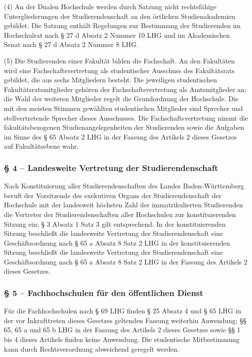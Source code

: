 \documentclass[
10pt,
a4paper,
twoside,								%
titlepage=false,							%
draft=false								%
]{scrartcl}
\begin{document}
(4) An der Dualen Hochschule werden durch Satzung nicht rechtsfähige Untergliederungen der Studierendenschaft an den örtlichen Studienakademien gebildet. Die Satzung enthält Regelungen zur Bestimmung der Studierenden im Hochschulrat nach § 27 d Absatz 2 Nummer 10 LHG und im Akademischen Senat nach § 27 d Absatz 2 Nummer 8 LHG.

(5) Die Studierenden einer Fakultät bilden die Fachschaft. An den Fakultäten wird eine Fachschaftsvertretung als studentischer Ausschuss des Fakultätsrats gebildet, die aus sechs Mitgliedern besteht. Die jeweiligen studentischen Fakultätsratsmitglieder gehören der Fachschaftsvertretung als Amtsmitglieder an; die Wahl der weiteren Mitglieder regelt die Grundordnung der Hochschule. Die mit den meisten Stimmen gewählten studentischen Mitglieder sind Sprecher und stellvertretende Sprecher dieses Ausschusses. Die Fachschaftsvertretung nimmt die fakultätsbezogenen Studienangelegenheiten der Studierenden sowie die Aufgaben im Sinne des § 65 Absatz 2 LHG in der Fassung des Artikels 2 dieses Gesetzes auf Fakultätsebene wahr.


\subsubsection*{§ 4 – Landesweite Vertretung der Studierendenschaft}

Nach Konstituierung aller Studierendenschaften des Landes Baden-Württemberg beruft der Vorsitzende des exekutiven Organs der Studierendenschaft der Hochschule mit der landesweit höchsten Zahl der immatrikulierten Studierenden die Vertreter der Studierendenschaften aller Hochschulen zur konstituierenden Sitzung ein; § 3 Absatz 1 Satz 3 gilt entsprechend. In der konstituierenden Sitzung beschließt die landesweite Vertretung der Studierendenschaft eine Geschäftsordnung nach § 65 a Absatz 8 Satz 2 LHG in der konstituierenden Sitzung beschließt die landesweite Vertretung der Studierendenschaft eine Geschäftsordnung nach § 65 a Absatz 8 Satz 2 LHG in der Fassung des Artikels 2 dieses Gesetzes.


\subsubsection*{§ 5 – Fachhochschulen für den öffentlichen Dienst}

Für die Fachhochschulen nach § 69 LHG finden § 25 Absatz 4 und § 65 LHG in der vor Inkrafttreten dieses Gesetzes geltenden Fassung weiterhin Anwendung; §§ 65, 65 a und 65 b LHG in der Fassung des Artikels 2 dieses Gesetzes sowie §§ 1 bis 4 dieses Artikels finden keine Anwendung. Die studentische Mitbestimmung kann durch Rechtsverordnung abweichend geregelt werden.
\end{document}
